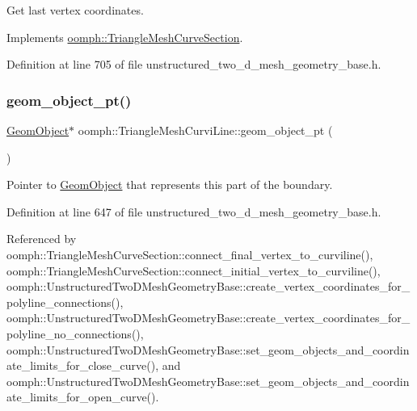 Get last vertex coordinates. 



Implements \hyperlink{classoomph_1_1TriangleMeshCurveSection_aa5bbea1d7c1157f25d3b93101ac4b80f}{oomph\+::\+Triangle\+Mesh\+Curve\+Section}.



Definition at line 705 of file unstructured\+\_\+two\+\_\+d\+\_\+mesh\+\_\+geometry\+\_\+base.\+h.

\mbox{\label{classoomph_1_1TriangleMeshCurviLine_a037242aaee2ba082658f87db87f6ef69}} 
\subsubsection{\texorpdfstring{geom\+\_\+object\+\_\+pt()}{geom\_object\_pt()}}
{\footnotesize\ttfamily \hyperlink{classoomph_1_1GeomObject}{Geom\+Object}$\ast$ oomph\+::\+Triangle\+Mesh\+Curvi\+Line\+::geom\+\_\+object\+\_\+pt (\begin{DoxyParamCaption}{ }\end{DoxyParamCaption})\hspace{0.3cm}{\ttfamily [inline]}}



Pointer to \hyperlink{classoomph_1_1GeomObject}{Geom\+Object} that represents this part of the boundary. 



Definition at line 647 of file unstructured\+\_\+two\+\_\+d\+\_\+mesh\+\_\+geometry\+\_\+base.\+h.



Referenced by oomph\+::\+Triangle\+Mesh\+Curve\+Section\+::connect\+\_\+final\+\_\+vertex\+\_\+to\+\_\+curviline(), oomph\+::\+Triangle\+Mesh\+Curve\+Section\+::connect\+\_\+initial\+\_\+vertex\+\_\+to\+\_\+curviline(), oomph\+::\+Unstructured\+Two\+D\+Mesh\+Geometry\+Base\+::create\+\_\+vertex\+\_\+coordinates\+\_\+for\+\_\+polyline\+\_\+connections(), oomph\+::\+Unstructured\+Two\+D\+Mesh\+Geometry\+Base\+::create\+\_\+vertex\+\_\+coordinates\+\_\+for\+\_\+polyline\+\_\+no\+\_\+connections(), oomph\+::\+Unstructured\+Two\+D\+Mesh\+Geometry\+Base\+::set\+\_\+geom\+\_\+objects\+\_\+and\+\_\+coordinate\+\_\+limits\+\_\+for\+\_\+close\+\_\+curve(), and oomph\+::\+Unstructured\+Two\+D\+Mesh\+Geometry\+Base\+::set\+\_\+geom\+\_\+objects\+\_\+and\+\_\+coordinate\+\_\+limits\+\_\+for\+\_\+open\+\_\+curve().

